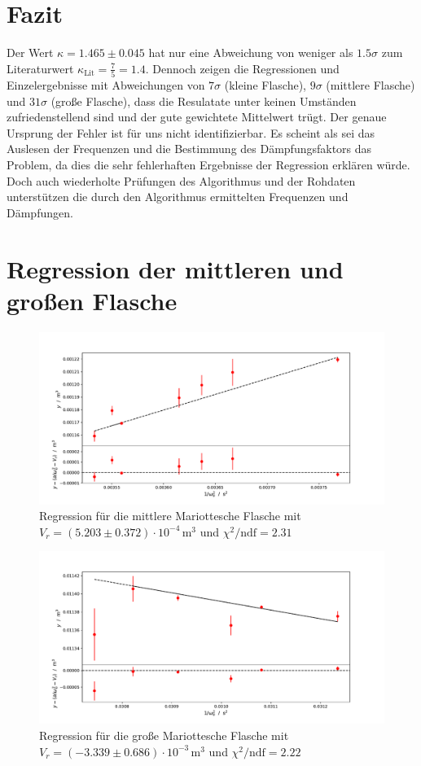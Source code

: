 \documentclass[a4paper, 12pt]{scrartcl}
\begin{document}
\section{Fazit}
Der Wert $\kappa = 1.465\pm 0.045$ hat nur eine Abweichung von weniger als $1.5\sigma$ zum Literaturwert $\kappa_{\text{Lit}} = \frac{7}{5} =1.4$. Dennoch zeigen die Regressionen und Einzelergebnisse mit Abweichungen von $7\sigma$ (kleine Flasche), $9\sigma$ (mittlere Flasche) und $31\sigma$ (große Flasche), dass die Resulatate unter keinen Umständen zufriedenstellend sind und der gute gewichtete Mittelwert trügt. Der genaue Ursprung der Fehler ist für uns nicht identifizierbar. Es scheint als sei das Auslesen der Frequenzen und die Bestimmung des Dämpfungsfaktors das Problem, da dies die sehr fehlerhaften Ergebnisse der Regression erklären würde. Doch auch wiederholte Prüfungen des Algorithmus und der Rohdaten unterstützen die durch den Algorithmus ermittelten Frequenzen und Dämpfungen. 

\appendix
\section{Regression der mittleren und großen Flasche}\label{app:reg}
\begin{figure}[H]
\centering
\includegraphics[width=\textwidth]{plots/regression_mittel.pdf}
\caption{Regression für die mittlere Mariottesche Flasche mit $V_r = (5.203 \pm 0.372)\cdot 10^{-4}\,\text{m}^3$ und $\chi^2/\text{ndf} = 2.31$}
\end{figure}
\begin{figure}[H]
\centering
\includegraphics[width=\textwidth]{plots/regression_grosse.pdf}
\caption{Regression für die große Mariottesche Flasche mit $V_r = (-3.339 \pm 0.686)\cdot 10^{-3}\,\text{m}^3$ und $\chi^2/\text{ndf} = 2.22$}
\end{figure}
\end{document}
